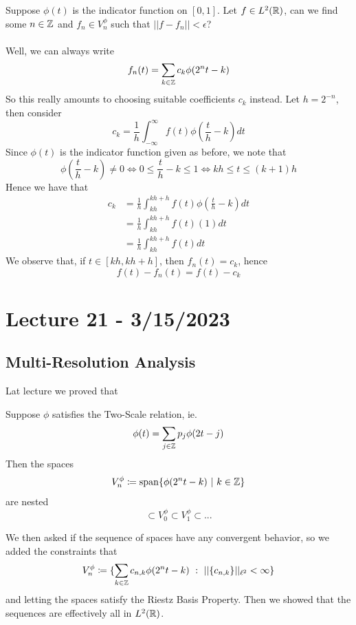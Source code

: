 \documentclass{article}
\begin{document}
\begin{example}
    Suppose $\phi(t)$ is the indicator function on $[0, 1]$. Let $f \in L^2(\mathbb{R})$, can we find some $n \in \mathbb{Z}$ and $f_n \in V_n^\phi$ such that $||f - f_n|| < \epsilon$?\\\\
    Well, we can always write
    \[f_n(t) = \sum_{k \in \mathbb{Z}} c_k \phi(2^n t - k)\]
    So this really amounts to choosing suitable coefficients $c_k$ instead. Let $h = 2^{-n}$, then consider
    \[c_k = \frac{1}{h} \int_{-\infty}^\infty f(t) \phi(\frac{t}{h} - k) dt\]
    Since $\phi(t)$ is the indicator function given as before, we note that
    \[\phi(\frac{t}{h} - k) \neq 0 \iff 0 \leq \frac{t}{h} - k \leq 1 \iff kh \leq t \leq (k+1)h\]
    Hence we have that
    \begin{align*}
        c_k &= \frac{1}{h} \int_{kh}^{kh + h} f(t) \phi(\frac{t}{h} - k) dt\\
        &=  \frac{1}{h} \int_{kh}^{kh + h} f(t)(1) dt \tag*{$\phi$ is an indicator function}\\
        &= \frac{1}{h} \int_{kh}^{kh + h} f(t) dt
   \end{align*}
   We observe that, if $t \in [kh, kh + h]$, then $f_n(t) = c_k$, hence 
   \[f(t) - f_n(t) = f(t) - c_k\]
\end{example}

\newpage
\section{Lecture 21 - 3/15/2023}

\subsection{Multi-Resolution Analysis}

Lat lecture we proved that
\begin{theorem}
    Suppose $\phi$ satisfies the Two-Scale relation, ie.
    \[\phi(t) = \sum_{j \in \mathbb{Z}} p_j \phi(2t - j)\]
    Then the spaces
    \[V_n^\phi \coloneqq \operatorname{span} \{\phi(2^n t - k)\ |\ k \in \mathbb{Z}\}\]
    are nested
    \[\subset V_0^\phi \subset V_1^\phi \subset ...\]
\end{theorem}

We then asked if the sequence of spaces have any convergent behavior, so we added the constraints that
\[V_n^\phi \coloneqq \{\sum_{k \in \mathbb{Z}} c_{n, k} \phi(2^n t - k)\ :\ ||\{c_{n, k}\}||_{\ell^2} < \infty \}\]
and letting the spaces satisfy the Riestz Basis Property. Then we showed that the sequences are effectively all in $L^2(\mathbb{R})$.\\\\
\end{document}
